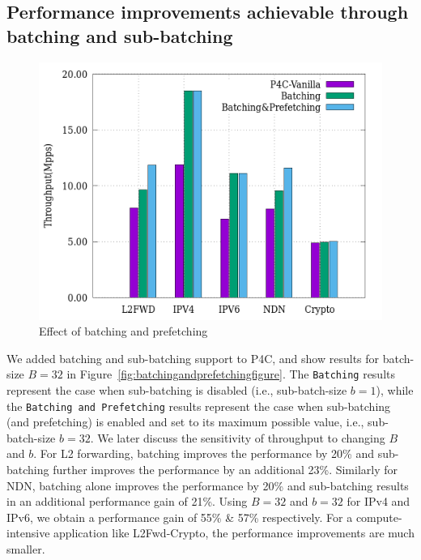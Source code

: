 \subsection{Performance improvements achievable through batching and sub-batching}
\label{batchingandprefetching}
\begin{figure}[ht]
\includegraphics[width = \linewidth]{Figures/effectofbatching.png}
\caption{Effect of batching and prefetching}
\label{batchingandprefetchingfigure}
\end{figure}
We added batching and sub-batching support to P4C, and show results for batch-size $B=32$
in Figure~\ref{fig:batchingandprefetchingfigure}. The {\tt Batching} results represent the case when sub-batching
is disabled (i.e., sub-batch-size $b=1$), while the {\tt Batching and Prefetching} results represent the case
when sub-batching (and prefetching) is enabled and set to its maximum possible value, i.e., sub-batch-size $b=32$.
We later discuss the sensitivity of
throughput to changing $B$ and $b$.
For L2 forwarding, batching improves the performance by 20\% and sub-batching further improves the performance by an additional 23\%. Similarly
for NDN, batching alone improves the performance by 20\% and sub-batching results in an additional performance gain of 21\%.
Using $B=32$ and $b=32$ for IPv4 and IPv6, we obtain a performance gain of 55\% \& 57\% respectively.
For a compute-intensive application like L2Fwd-Crypto, the performance improvements are much smaller.

